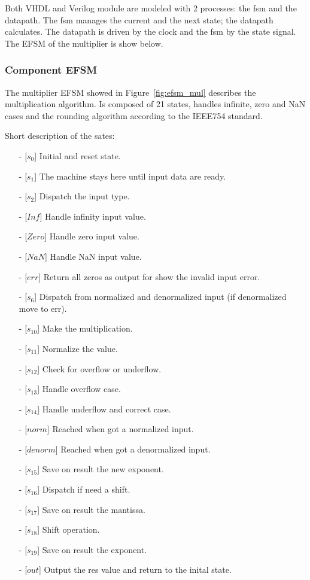 \documentclass[]{IEEEtran}
\begin{document}
	Both VHDL and Verilog module are modeled with 2 processes: the fsm and the datapath. The fsm manages the current and the next state; the datapath calculates. The datapath is driven by the clock and the fsm by the state signal.
	The EFSM of the multiplier is show below.
	
	\subsubsection{Component EFSM}
	The multiplier EFSM showed in Figure~\ref{fig:efsm_mul} describes the multiplication algorithm.
	Is composed of 21 states, handles infinite, zero and NaN cases and the rounding algorithm according to the IEEE754 standard.
	
	Short description of the sates:
	\begin{itemize}
		\item [-] [$s_0$] Initial and reset state.
		\item [-] [$s_1$] The machine stays here until input data are ready.
		\item [-] [$s_2$] Dispatch the input type.
		\item [-] [$Inf$] Handle infinity input value.
		\item [-] [$Zero$] Handle zero input value.
		\item [-] [$NaN$] Handle NaN input value.
		\item [-] [$err$] Return all zeros as output for show the invalid input error.
		\item [-] [$s_6$] Dispatch from normalized and denormalized input (if denormalized move to err).
		\item [-] [$s_10$] Make the multiplication.
		\item [-] [$s_11$] Normalize the value.
		\item [-] [$s_12$] Check for overflow or underflow.
		\item [-] [$s_13$] Handle overflow case.
		\item [-] [$s_14$] Handle underflow and correct case.
		\item [-] [$norm$] Reached when got a normalized input.
		\item [-] [$denorm$] Reached when got a denormalized input.
		\item [-] [$s_15$] Save on result the new exponent.
		\item [-] [$s_16$] Dispatch if need a shift.
		\item [-] [$s_17$] Save on result the mantissa.
		\item [-] [$s_18$] Shift operation.
		\item [-] [$s_19$] Save on result the exponent.
		\item [-] [$out$] Output the res value and return to the inital state.
	\end{itemize}
\end{document}
